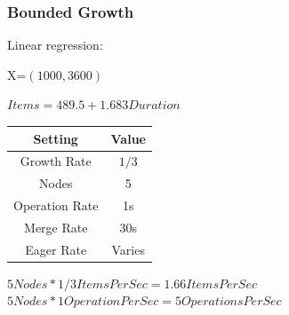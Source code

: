 \documentclass{beamer}
\begin{document}
    \begin{frame}[shrink]
        \frametitle{Bounded Growth}

        Linear regression:

        {\tiny X=$(1000, 3600)$}

        \begin{center}
            $Items = 489.5 + 1.683 Duration$
        \end{center}

        \begin{center}
            \begin{tabular}{ ||c c||}
                \hline
                Setting & Value \\
                \hline
                Growth Rate & $1/3$ \\
                Nodes & 5 \\
                Operation Rate & 1s \\
                Merge Rate & 30s \\
                Eager Rate & Varies \\
                \hline
            \end{tabular}
        \end{center}

        \begin{center}
            $5Nodes*1/3 Items Per Sec = 1.66 Items Per Sec$
            $5Nodes*1 Operation Per Sec = 5 Operations Per Sec$
        \end{center}
    \end{frame}
\end{document}
